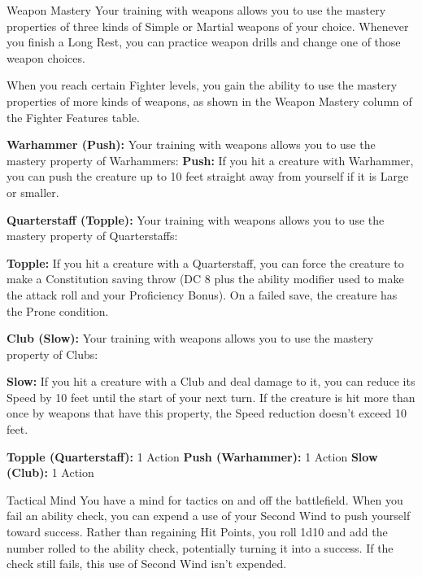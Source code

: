 \begin{DndComment}[]{Weapon Mastery}
	Your training with weapons allows you to use the mastery properties of three kinds of Simple or Martial weapons of your choice. 
	Whenever you finish a Long Rest, you can practice weapon drills and change one of those weapon choices.
	
	When you reach certain Fighter levels, you gain the ability to use the mastery properties of more kinds of weapons, as shown in the Weapon Mastery column of the Fighter Features table.
	
	\textbf{Warhammer (Push):} Your training with weapons allows you to use the mastery property of Warhammers:
	\textbf{Push:} If you hit a creature with Warhammer, you can push the creature up to 10 feet straight away from yourself if it is Large or smaller.

	\textbf{Quarterstaff (Topple):} Your training with weapons allows you to use the mastery property of Quarterstaffs:
	
	\textbf{Topple:} If you hit a creature with a Quarterstaff, you can force the creature to make a Constitution saving throw (DC 8 plus the ability modifier used to make the attack roll and your Proficiency Bonus). On a failed save, the creature has the Prone condition.
	
	\textbf{Club (Slow):} Your training with weapons allows you to use the mastery property of Clubs:
	
	\textbf{Slow:}  If you hit a creature with a Club and deal damage to it, you can reduce its Speed by 10 feet until the start of your next turn. 
	If the creature is hit more than once by weapons that have this property, the Speed reduction doesn’t exceed 10 feet.
	
	\textbf{Topple (Quarterstaff):} 1 Action
	\textbf{Push (Warhammer):} 1 Action
	\textbf{Slow (Club):} 1 Action

\end{DndComment}

\begin{DndComment}[]{Tactical Mind}
	You have a mind for tactics on and off the battlefield. 
	When you fail an ability check, you can expend a use of your Second Wind to push yourself toward success. 
	Rather than regaining Hit Points, you roll 1d10 and add the number rolled to the ability check, potentially turning it into a success. 
	If the check still fails, this use of Second Wind isn’t expended.
	
\end{DndComment}

